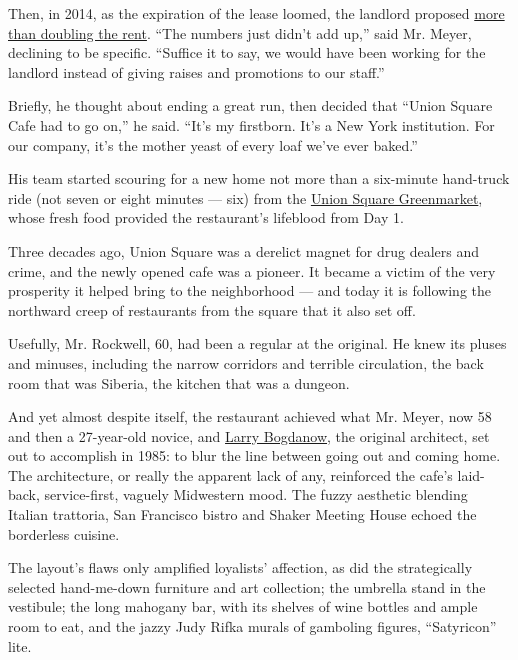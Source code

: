 Then, in 2014, as the expiration of the lease loomed, the landlord
proposed
\href{http://www.nytimes3xbfgragh.onion/2014/06/24/dining/union-square-cafe-joins-other-victims-of-new-york-citys-rising-rents.html}{more
than doubling the rent}. ``The numbers just didn't add up,'' said Mr.
Meyer, declining to be specific. ``Suffice it to say, we would have been
working for the landlord instead of giving raises and promotions to our
staff.''

Briefly, he thought about ending a great run, then decided that ``Union
Square Cafe had to go on,'' he said. ``It's my firstborn. It's a New
York institution. For our company, it's the mother yeast of every loaf
we've ever baked.''

His team started scouring for a new home not more than a six-minute
hand-truck ride (not seven or eight minutes --- six) from the
\href{http://www.grownyc.org/greenmarket/manhattan-union-square-m}{Union
Square Greenmarket}, whose fresh food provided the restaurant's
lifeblood from Day 1.

Three decades ago, Union Square was a derelict magnet for drug dealers
and crime, and the newly opened cafe was a pioneer. It became a victim
of the very prosperity it helped bring to the neighborhood --- and today
it is following the northward creep of restaurants from the square that
it also set off.

Usefully, Mr. Rockwell, 60, had been a regular at the original. He knew
its pluses and minuses, including the narrow corridors and terrible
circulation, the back room that was Siberia, the kitchen that was a
dungeon.

And yet almost despite itself, the restaurant achieved what Mr. Meyer,
now 58 and then a 27-year-old novice, and
\href{http://www.nytimes3xbfgragh.onion/2011/06/30/dining/larry-bogdanow-architect-dies-at-64.html}{Larry
Bogdanow}, the original architect, set out to accomplish in 1985: to
blur the line between going out and coming home. The architecture, or
really the apparent lack of any, reinforced the cafe's laid-back,
service-first, vaguely Midwestern mood. The fuzzy aesthetic blending
Italian trattoria, San Francisco bistro and Shaker Meeting House echoed
the borderless cuisine.

The layout's flaws only amplified loyalists' affection, as did the
strategically selected hand-me-down furniture and art collection; the
umbrella stand in the vestibule; the long mahogany bar, with its shelves
of wine bottles and ample room to eat, and the jazzy Judy Rifka murals
of gamboling figures, ``Satyricon'' lite.

